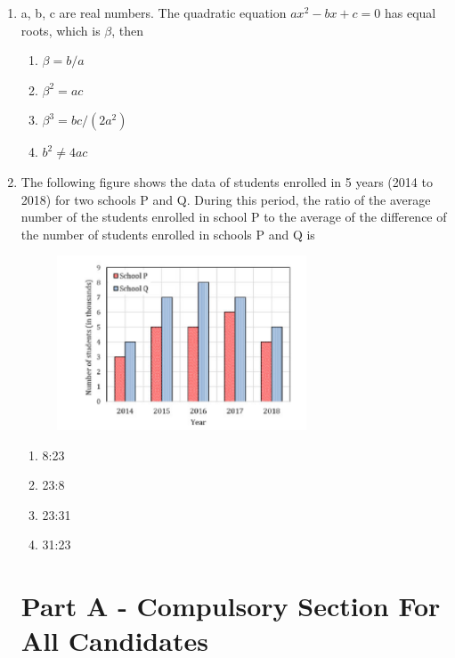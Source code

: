 \documentclass[journal,12pt,onecolumn]{IEEEtran}
\begin{document}
\begin{enumerate}
\item a, b, c are real numbers. The quadratic equation $ax^{2}-bx+c=0$ has equal roots, which is $\beta$, then

\hfill{}
\begin{multicols}{2}
\begin{enumerate}
    \item $\beta=b/a$
    \item $\beta^{2}=ac$
    \item $\beta^{3}=bc/(2a^{2})$
    \item $b^{2}\ne4ac$
\end{enumerate}
\end{multicols}

\item The following figure shows the data of students enrolled in 5 years (2014 to 2018) for two schools P and Q. During this period, the ratio of the average number of the students enrolled in school P to the average of the difference of the number of students enrolled in schools P and Q is

\hfill{}
\begin{figure}[h!]
    \centering
    \includegraphics[width=0.7\textwidth]{figs/fig2.png}
    \caption{}
    \label{fig:ga_q10}
\end{figure}
\begin{multicols}{4}
\begin{enumerate}
    \item 8:23
    \item 23:8
    \item 23:31
    \item 31:23
\end{enumerate}
\end{multicols}



\newpage
\section*{Part A - Compulsory Section For All Candidates}




\end{enumerate}
\end{document}
